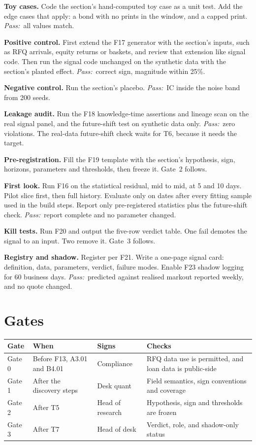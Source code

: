 \documentclass[11pt,letterpaper]{article}
\newcommand{\stepname}[1]{\textbf{#1.}}
\newcommand{\Pass}{\textit{Pass:}~}
\begin{document}
\begin{ladder}[label=\textbf{T\arabic*}]
\item \stepname{Toy cases} Code the section's hand-computed toy case as a unit test. Add the edge cases that apply: a bond with no prints in the window, and a capped print. \Pass all values match.
\item \stepname{Positive control} First extend the F17 generator with the section's inputs, such as RFQ arrivals, equity returns or baskets, and review that extension like signal code. Then run the signal code unchanged on the synthetic data with the section's planted effect. \Pass correct sign, magnitude within 25\%.
\item \stepname{Negative control} Run the section's placebo. \Pass IC inside the noise band from 200 seeds.
\item \stepname{Leakage audit} Run the F18 knowledge-time assertions and lineage scan on the real signal panel, and the future-shift test on synthetic data only. \Pass zero violations. The real-data future-shift check waits for T6, because it needs the target.
\item \stepname{Pre-registration} Fill the F19 template with the section's hypothesis, sign, horizons, parameters and thresholds, then freeze it. Gate~2 follows.
\item \stepname{First look} Run F16 on the statistical residual, mid to mid, at 5 and 10 days. Pilot slice first, then full history. Evaluate only on dates after every fitting sample used in the build steps. Report only pre-registered statistics plus the future-shift check. \Pass report complete and no parameter changed.
\item \stepname{Kill tests} Run F20 and output the five-row verdict table. One fail demotes the signal to an input. Two remove it. Gate~3 follows.
\item \stepname{Registry and shadow} Register per F21. Write a one-page signal card: definition, data, parameters, verdict, failure modes. Enable F23 shadow logging for 60 business days. \Pass predicted against realised markout reported weekly, and no quote changed.
\end{ladder}

\section{Gates}
\begin{center}
\begin{tabularx}{\textwidth}{@{}l l l X@{}}
\toprule
Gate & When & Signs & Checks \\
\midrule
Gate 0 & Before F13, A3.01 and B4.01 & Compliance & RFQ data use is permitted, and loan data is public-side \\
Gate 1 & After the discovery steps & Desk quant & Field semantics, sign conventions and coverage \\
Gate 2 & After T5 & Head of research & Hypothesis, sign and thresholds are frozen \\
Gate 3 & After T7 & Head of desk & Verdict, role, and shadow-only status \\
\bottomrule
\end{tabularx}
\end{center}
\end{document}
